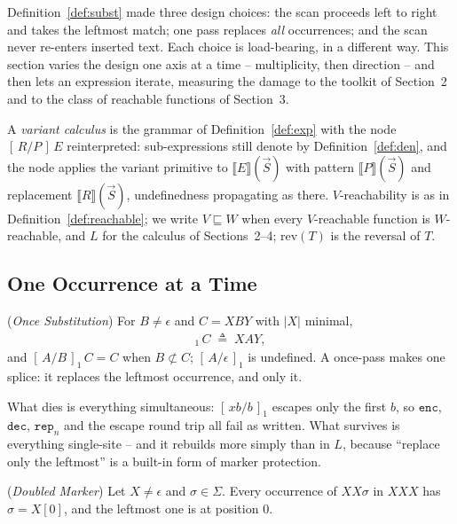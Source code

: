 \documentclass[runningheads,envcountsect]{llncs}
\begin{document}
Definition~\ref{def:subst} made three design choices: the scan proceeds left to right and takes the leftmost match; one pass replaces \emph{all} occurrences; and the scan never re-enters inserted text. Each choice is load-bearing, in a different way. This section varies the design one axis at a time -- multiplicity, then direction -- and then lets an expression iterate, measuring the damage to the toolkit of Section~2 and to the class of reachable functions of Section~3.

A \emph{variant calculus} is the grammar of Definition~\ref{def:exp} with the node $[\,R/P\,]\,E$ reinterpreted: sub-expressions still denote by Definition~\ref{def:den}, and the node applies the variant primitive to $\llbracket E \rrbracket(\vec S)$ with pattern $\llbracket P \rrbracket(\vec S)$ and replacement $\llbracket R \rrbracket(\vec S)$, undefinedness propagating as there. $V$-reachability is as in Definition~\ref{def:reachable}; we write $V \sqsubseteq W$ when every $V$-reachable function is $W$-reachable, and $L$ for the calculus of Sections~2--4; $\mathrm{rev}(T)$ is the reversal of $T$.

\subsection{One Occurrence at a Time}

\begin{definition}
    (\emph{Once Substitution})
    \label{def:once}
    For $B \neq \epsilon$ and $C = XBY$ with $|X|$ minimal,
    \begin{align}
        [\,A/B\,]_1\,C \;\triangleq\; XAY,
    \end{align}
    and $[\,A/B\,]_1\,C = C$ when $B \not\subset C$; $[\,A/\epsilon\,]_1$ is undefined. A once-pass makes one splice: it replaces the leftmost occurrence, and only it.
\end{definition}

What dies is everything simultaneous: $[\,xb/b\,]_1$ escapes only the first $b$, so $\mathtt{enc}$, $\mathtt{dec}$, $\mathtt{rep}_n$ and the escape round trip all fail as written. What survives is everything single-site -- and it rebuilds more simply than in $L$, because ``replace only the leftmost'' is a built-in form of marker protection.

\begin{lemma}
    (\emph{Doubled Marker})
    \label{lem:doubled}
    Let $X \neq \epsilon$ and $\sigma \in \Sigma$. Every occurrence of $XX\sigma$ in $XXX$ has $\sigma = X[0]$, and the leftmost one is at position $0$.
\end{lemma}
\end{document}

